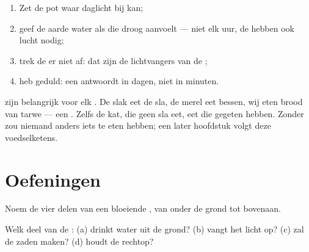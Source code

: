 \begin{method}\label{met:g1:plants-around-us:care}
\begin{enumerate}
  \item Zet de pot waar daglicht bij kan;
  \item geef de aarde water als die droog aanvoelt --- niet elk uur, de
         hebben ook lucht nodig;
  \item trek de  er niet af: dat zijn de lichtvangers van de
        ;
  \item heb geduld: een  antwoordt in dagen, niet in minuten.
\end{enumerate}
\end{method}

\begin{remark}\label{rem:g1:plants-around-us:food}
 zijn belangrijk voor elk . De slak eet de sla, de merel eet
bessen, wij eten brood van tarwe --- een . Zelfs de kat, die geen
sla eet, eet  die  gegeten hebben. Zonder  zou
niemand anders iets te eten hebben; een later hoofdstuk volgt deze
voedselketens.
\end{remark}

\section{Oefeningen}

\begin{exercise}[$\star$]\label{exo:g1:plants-around-us:1}
Noem de vier delen van een bloeiende , van onder de grond tot
bovenaan.
\end{exercise}

\begin{exercise}[$\star$]\label{exo:g1:plants-around-us:2}
Welk deel van de : (a) drinkt water uit de grond? (b) vangt het
licht op? (c) zal de zaden maken? (d) houdt de  rechtop?
\end{exercise}

